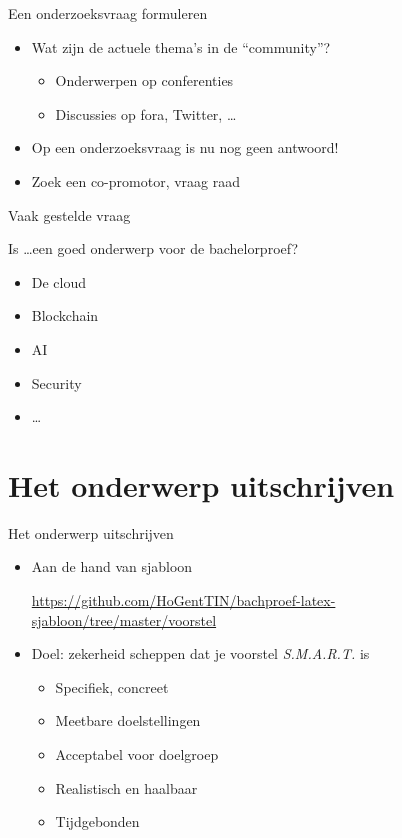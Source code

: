 \documentclass[aspectratio=169,usenames,dvipsnames]{beamer}
\begin{document}
\begin{frame}{Een onderzoeksvraag formuleren}
  
  \begin{itemize}
    \item Wat zijn de actuele thema's in de ``community''?
    \begin{itemize}
      \item Onderwerpen op conferenties
      \item Discussies op fora, Twitter, \ldots
    \end{itemize}
    \item Op een onderzoeksvraag is nu nog geen antwoord!
    \item Zoek een co-promotor, vraag raad
  \end{itemize}
  
\end{frame}

\begin{frame}{Vaak gestelde vraag}
  
  Is \ldots een goed onderwerp voor de bachelorproef?
  
  \begin{itemize}
    \item De cloud
    \item Blockchain
    \item AI
    \item Security
    \item \ldots
  \end{itemize}

\end{frame}

\section{Het onderwerp uitschrijven}

\begin{frame}{Het onderwerp uitschrijven}

  \begin{itemize}
    \item Aan de hand van sjabloon
    
    \url{https://github.com/HoGentTIN/bachproef-latex-sjabloon/tree/master/voorstel}
    
    \item Doel: zekerheid scheppen dat je voorstel \emph{S.M.A.R.T.} is
    \begin{itemize}
      \item Specifiek, concreet
      \item Meetbare doelstellingen
      \item Acceptabel voor doelgroep
      \item Realistisch en haalbaar
      \item Tijdgebonden
    \end{itemize}
  \end{itemize}
\end{frame}
\end{document}
